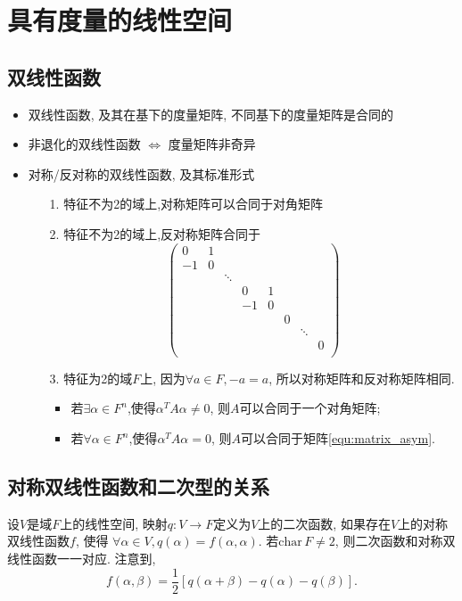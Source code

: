 \section{具有度量的线性空间}
\subsection{双线性函数}
\begin{itemize}
    \item 双线性函数, 及其在基下的度量矩阵, 不同基下的度量矩阵是合同的
    \item 非退化的双线性函数 $\Longleftrightarrow$ 度量矩阵非奇异
    \item 对称/反对称的双线性函数, 及其标准形式
    \begin{itemize}
        \item[1.] 特征不为2的域上,对称矩阵可以合同于对角矩阵
        \item[2.] 特征不为2的域上,反对称矩阵合同于
        \begin{equation}
        \begin{pmatrix}
        0&1\\
        -1&0\\
        &&\ddots\\
        &&&0&1\\
        &&&-1&0\\
        &&&&&0\\
        &&&&&&\ddots\\
        &&&&&&&0\\
        \end{pmatrix}
        \label{equ:matrix_asym}
        \end{equation}
        \item[3.] 特征为2的域$F$上, 因为$\forall a\in F, -a=a$, 
        所以对称矩阵和反对称矩阵相同.
        \begin{itemize}
            \item 若$\exists \alpha \in F^n$,使得$\alpha^T A \alpha \ne 0$,
                  则$A$可以合同于一个对角矩阵;
            \item 若$\forall \alpha \in F^n$,使得$\alpha^T A \alpha = 0$,
                  则$A$可以合同于矩阵\ref{equ:matrix_asym}.
        \end{itemize}
    \end{itemize}
\end{itemize}

\subsection{对称双线性函数和二次型的关系}
设$V$是域$F$上的线性空间, 映射$q: V\rightarrow F$定义为$V$上的二次函数,
如果存在$V$上的对称双线性函数$f$, 使得
$\forall \alpha \in V,q(\alpha) = f(\alpha, \alpha)$.
若$\mathrm{char}\,F \ne 2$,
则二次函数和对称双线性函数一一对应.
注意到,
\begin{equation}
\nonumber
f(\alpha, \beta) = 
\frac{1}{2}[q(\alpha+\beta) - q(\alpha) - q(\beta)].
\end{equation}

